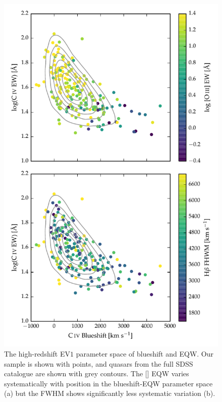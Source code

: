 \begin{figure}
\centering 
    \includegraphics[width=\columnwidth]{figures/chapter04/ev1.pdf} 
    \caption[{The high-redshift EV$1$ parameter space of  blueshift and EQW.}]{The high-redshift EV$1$ parameter space of  blueshift and EQW. Our sample is shown with points, and quasars from the full SDSS catalogue are shown with grey contours. The [] EQW varies systematically with position in the  blueshift-EQW parameter space (a) but the \hb FWHM shows significantly less systematic variation (b).}      
    \label{fig:ev1}
\end{figure}

